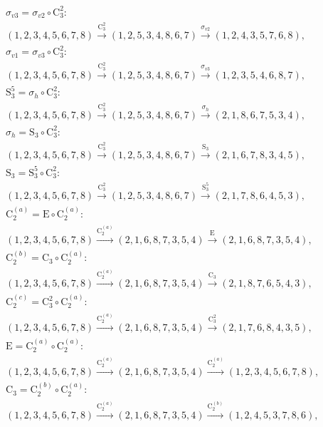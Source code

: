 \begin{align*}
& \sigma_{v3} = \sigma_{v2} \circ \mathrm{C}_{3}^{2}:\; \\& (1,2,3,4,5,6,7,8) \xrightarrow{\mathrm{C}_{3}^{2}} (1,2,5,3,4,8,6,7) \xrightarrow{\sigma_{v2}} (1,2,4,3,5,7,6,8), \\
& \sigma_{v1} = \sigma_{v3} \circ \mathrm{C}_{3}^{2}:\; \\& (1,2,3,4,5,6,7,8) \xrightarrow{\mathrm{C}_{3}^{2}} (1,2,5,3,4,8,6,7) \xrightarrow{\sigma_{v3}} (1,2,3,5,4,6,8,7), \\
& \mathrm{S}_{3}^{5} = \sigma_{h} \circ \mathrm{C}_{3}^{2}:\; \\& (1,2,3,4,5,6,7,8) \xrightarrow{\mathrm{C}_{3}^{2}} (1,2,5,3,4,8,6,7) \xrightarrow{\sigma_{h}} (2,1,8,6,7,5,3,4), \\
& \sigma_{h} = \mathrm{S}_{3} \circ \mathrm{C}_{3}^{2}:\; \\& (1,2,3,4,5,6,7,8) \xrightarrow{\mathrm{C}_{3}^{2}} (1,2,5,3,4,8,6,7) \xrightarrow{\mathrm{S}_{3}} (2,1,6,7,8,3,4,5), \\
& \mathrm{S}_{3} = \mathrm{S}_{3}^{5} \circ \mathrm{C}_{3}^{2}:\; \\& (1,2,3,4,5,6,7,8) \xrightarrow{\mathrm{C}_{3}^{2}} (1,2,5,3,4,8,6,7) \xrightarrow{\mathrm{S}_{3}^{5}} (2,1,7,8,6,4,5,3), \\
& \mathrm{C}_{2}^{(a)} = \mathrm{E} \circ \mathrm{C}_{2}^{(a)}:\; \\& (1,2,3,4,5,6,7,8) \xrightarrow{\mathrm{C}_{2}^{(a)}} (2,1,6,8,7,3,5,4) \xrightarrow{\mathrm{E}} (2,1,6,8,7,3,5,4), \\
& \mathrm{C}_{2}^{(b)} = \mathrm{C}_{3} \circ \mathrm{C}_{2}^{(a)}:\; \\& (1,2,3,4,5,6,7,8) \xrightarrow{\mathrm{C}_{2}^{(a)}} (2,1,6,8,7,3,5,4) \xrightarrow{\mathrm{C}_{3}} (2,1,8,7,6,5,4,3), \\
& \mathrm{C}_{2}^{(c)} = \mathrm{C}_{3}^{2} \circ \mathrm{C}_{2}^{(a)}:\; \\& (1,2,3,4,5,6,7,8) \xrightarrow{\mathrm{C}_{2}^{(a)}} (2,1,6,8,7,3,5,4) \xrightarrow{\mathrm{C}_{3}^{2}} (2,1,7,6,8,4,3,5), \\
& \mathrm{E} = \mathrm{C}_{2}^{(a)} \circ \mathrm{C}_{2}^{(a)}:\; \\& (1,2,3,4,5,6,7,8) \xrightarrow{\mathrm{C}_{2}^{(a)}} (2,1,6,8,7,3,5,4) \xrightarrow{\mathrm{C}_{2}^{(a)}} (1,2,3,4,5,6,7,8), \\
& \mathrm{C}_{3} = \mathrm{C}_{2}^{(b)} \circ \mathrm{C}_{2}^{(a)}:\; \\& (1,2,3,4,5,6,7,8) \xrightarrow{\mathrm{C}_{2}^{(a)}} (2,1,6,8,7,3,5,4) \xrightarrow{\mathrm{C}_{2}^{(b)}} (1,2,4,5,3,7,8,6), \\

\end{align*}
